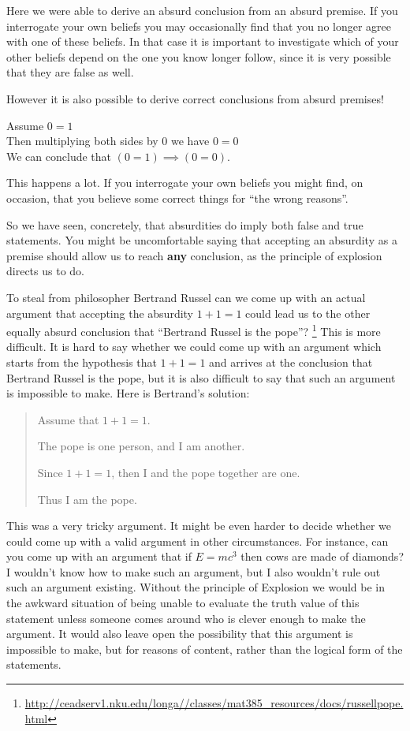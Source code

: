 Here we were able to derive an absurd conclusion from an absurd premise.    If you interrogate your own beliefs you may occasionally find that you no longer agree with one of these beliefs.  In that case it is important to investigate which of your other beliefs depend on the one you know longer follow, since it is very possible that they are false as well.

However it is also possible to derive correct conclusions from absurd premises!

\begin{fitch*}
	\textrm{Assume $0=1$}\\
	\fa \textrm{Then multiplying both sides by $0$  we have $0=0$}\\
	\textrm{We can conclude that $(0=1) \implies (0=0)$.}
\end{fitch*}

This happens a lot.  If you interrogate your own beliefs you might find, on occasion, that you believe some correct things for ``the wrong reasons''.

So we have seen, concretely, that absurdities do imply both false and true statements.  You might be uncomfortable saying that accepting an absurdity as a premise should allow us to reach \textbf{any} conclusion, as the principle of explosion directs us to do.

To steal from philosopher Bertrand Russel can we come up with an actual argument that accepting the absurdity $1 + 1 = 1$ could lead us to the other equally absurd conclusion that ``Bertrand Russel is the pope''? \footnote{\url{http://ceadserv1.nku.edu/longa//classes/mat385_resources/docs/russellpope.html}}  This is more difficult.  It is hard to say whether we could come up with an argument which starts from the hypothesis that $1+1 = 1$ and arrives at the conclusion that Bertrand Russel is the pope, but it is also difficult to say that such an argument is impossible to make.  Here is Bertrand's solution:

\begin{quote}
	Assume that $1+1 = 1$.
	
	The pope is one person, and I am another.
	
	Since $1+1 = 1$, then I and the pope together are one.
	
	Thus I am the pope.
\end{quote}

This was a very tricky argument.  It might be even harder to decide whether we could come up with a valid argument in other circumstances.  For instance, can you come up with an argument that if $E = mc^3$ then cows are made of diamonds?  I wouldn't know how to make such an argument, but I also wouldn't rule out such an argument existing.  Without the principle of Explosion we would be in the awkward situation of being unable to evaluate the truth value of this statement unless someone comes around who is clever enough to make the argument.  It would also leave open the possibility that this argument is impossible to make, but for reasons of content, rather than the logical form of the statements.

